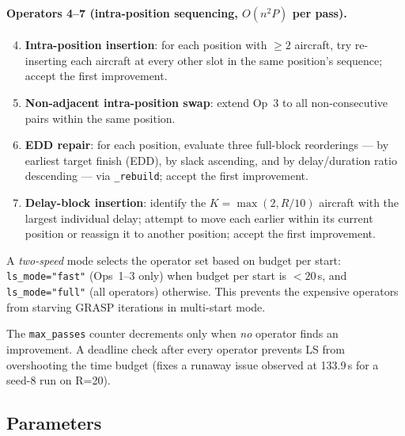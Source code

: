 \paragraph{Operators 4–7 (intra-position sequencing, $O(n^2 P)$ per pass).}
\begin{enumerate}[noitemsep]
    \setcounter{enumi}{3}
    \item \textbf{Intra-position insertion}: for each position with $\geq 2$
          aircraft, try re-inserting each aircraft at every other slot in the
          same position's sequence; accept the first improvement.
    \item \textbf{Non-adjacent intra-position swap}: extend Op~3 to all
          non-consecutive pairs within the same position.
    \item \textbf{EDD repair}: for each position, evaluate three full-block
          reorderings — by earliest target finish (EDD), by slack ascending,
          and by delay/duration ratio descending — via \texttt{\_rebuild};
          accept the first improvement.
    \item \textbf{Delay-block insertion}: identify the $K = \max(2, R/10)$
          aircraft with the largest individual delay; attempt to move each
          earlier within its current position or reassign it to another
          position; accept the first improvement.
\end{enumerate}

A \emph{two-speed} mode selects the operator set based on budget per start:
\texttt{ls\_mode="fast"} (Ops~1–3 only) when budget per start is $<20$\,s,
and \texttt{ls\_mode="full"} (all operators) otherwise.  This prevents the
expensive operators from starving GRASP iterations in multi-start mode.

The \texttt{max\_passes} counter decrements only when \emph{no} operator
finds an improvement.  A deadline check after every operator prevents LS
from overshooting the time budget (fixes a runaway issue observed at
133.9\,s for a seed-8 run on R=20).

\subsection{Parameters}

